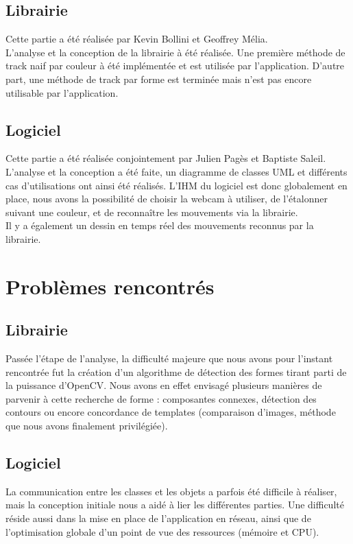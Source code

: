 \documentclass{article}
\begin{document}
		\subsection{Librairie}
		Cette partie a été réalisée par Kevin Bollini et Geoffrey Mélia. \\
			L'analyse et la conception de la librairie à été réalisée. Une première méthode de track naif par couleur à été implémentée et est utilisée par l'application. D'autre part, une méthode de track par forme est terminée mais n'est pas encore utilisable par l'application. 
		\subsection{Logiciel}
		Cette partie a été réalisée conjointement par Julien Pagès et Baptiste Saleil. \\
			L'analyse et la conception a été faite, un diagramme de classes UML et différents cas d'utilisations ont ainsi été réalisés. L'IHM du logiciel est donc globalement en place, nous avons la possibilité de choisir la webcam à utiliser, de l'étalonner suivant une couleur, et de reconnaître les mouvements via la librairie. \\
			Il y a également un dessin en temps réel des mouvements reconnus par la librairie. \\
	\section{Problèmes rencontrés}
		\subsection{Librairie}
			Passée l'étape de l'analyse, la difficulté majeure que nous avons pour l'instant rencontrée fut la création d'un algorithme de détection des formes tirant parti de la puissance d'OpenCV. Nous avons en effet envisagé plusieurs manières de parvenir à cette recherche de forme : composantes connexes, détection des contours ou encore concordance de templates (comparaison d'images, méthode que nous avons finalement privilégiée).
		\subsection{Logiciel}
			La communication entre les classes et les objets a parfois été difficile à réaliser, mais la conception initiale nous a aidé à lier les différentes parties. Une difficulté réside aussi dans la mise en place de l'application en réseau, ainsi que de l'optimisation globale d'un point de vue des ressources (mémoire et CPU).
\end{document}
